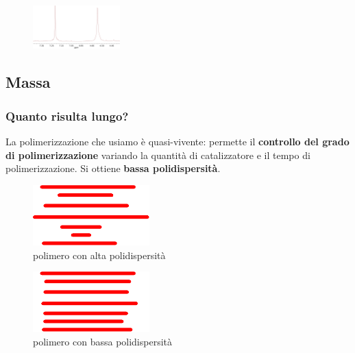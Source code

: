 \documentclass{beamer}
\begin{document}
\begin{frame}
\begin{figure}
\begin{minipage}{0.15\textwidth}
\end{minipage}
\includegraphics[trim=465 0 0 0cm,clip,width=0.3\textwidth]{img/ig2-15-nmr-h.pdf}\end{figure}
\end{frame}
\subsection{Massa}
\begin{frame}%
\frametitle{Quanto risulta lungo?}
La polimerizzazione che usiamo è quasi-vivente: permette il \textbf{controllo del grado di polimerizzazione} variando la quantità di catalizzatore e il tempo di polimerizzazione.
\vfill
Si ottiene \textbf{bassa polidispersità}.
\vfill
{\hfill
\begin{minipage}{.5\textwidth}\centering
\begin{figure}\centering 
\includegraphics[width=0.4\textwidth]{img/polidisperso.png}\\{\small polimero con alta polidispersità}
\end{figure}\end{minipage}\hfill
\begin{minipage}{.5\textwidth}\centering
\begin{figure}\centering 
\includegraphics[width=0.4\textwidth]{img/nonpolidisperso.png}\\{\small polimero con bassa polidispersità}
\end{figure}\end{minipage}\hfill}
\end{frame}
\end{document}
